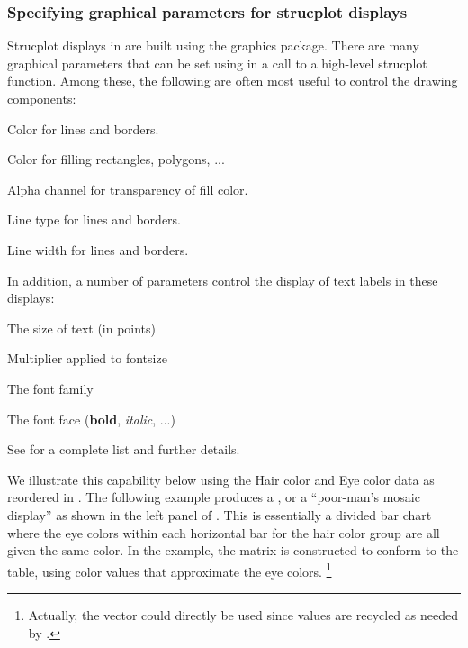 \documentclass[10pt,krantz2]{krantz}\usepackage[]{graphicx}\usepackage[]{color}
\begin{document}
\subsubsection{Specifying graphical parameters for strucplot displays}
Strucplot displays in  are built using the  graphics package.
There are many graphical parameters that can be set using 
in a call to a high-level strucplot function.  Among these, the following are
often most useful to control the drawing components:
\begin{proglist}
  \item[\code{col}]   Color for lines and borders.
  \item[\code{fill}] 	Color for filling rectangles, polygons, ...
  \item[\code{alpha}] 	Alpha channel for transparency of fill color.
  \item[\code{lty}] 	Line type for lines and borders.
  \item[\code{lwd}] 	Line width for lines and borders.
\end{proglist}
In addition, a number of parameters control the display of text labels in these displays:
\begin{proglist}
  \item[\code{fontsize}]   The size of text (in points)
  \item[\code{cex}] 	Multiplier applied to fontsize
  \item[\code{fontfamily}] 	The font family
  \item[\code{fontface}] 	The font face (\textbf{bold}, \textit{italic}, ...)
\end{proglist}
See  for a complete list and further details.

We illustrate this capability below using the Hair color and Eye color data
as reordered in .  The following example produces
a , or a ``poor-man's mosaic display''
as shown in the left panel of .
This is
essentially a divided bar chart where the eye colors
within each horizontal bar for the hair color group are all given the same
color.  In the example,
the matrix  is constructed to conform to the
 table, using color values that approximate the eye colors.%
\footnote{Actually, the  vector could directly be
  used since values are recycled as needed by .}
\end{document}

